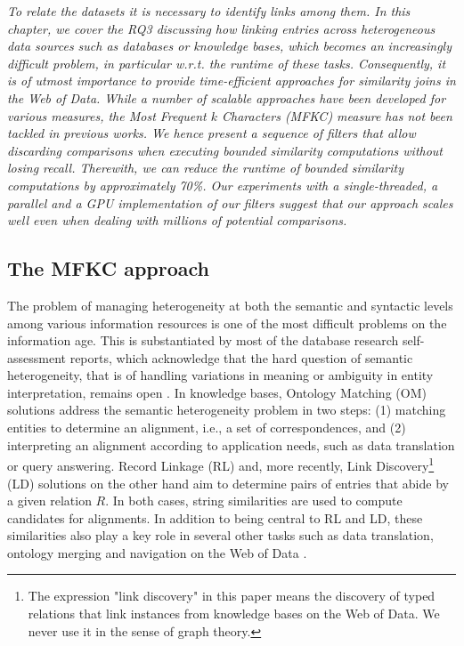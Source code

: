 \textit{To relate the datasets it is necessary to identify links among them. In this chapter, we cover the RQ3 discussing how linking entries across heterogeneous data sources such as databases or knowledge bases, which becomes an increasingly difficult problem, in particular w.r.t. the runtime of these tasks. 
Consequently, it is of utmost importance to provide time-efficient approaches for similarity joins in the Web of Data. 
While a number of scalable approaches have been developed for various measures, the Most Frequent $k$ Characters (MFKC) measure has not been tackled in previous works. 
We hence present a sequence of filters that allow discarding comparisons when executing bounded similarity computations without losing recall. 
Therewith, we can reduce the runtime of bounded similarity computations by approximately 70\%.  
Our experiments with a single-threaded, a parallel and a GPU implementation of our filters suggest that our approach scales well even when dealing with millions of potential comparisons.}

\subsection{The MFKC approach}
The problem of managing heterogeneity at both the semantic and syntactic levels among various information resources \cite{valdestilhasdbpediasameas,shvaiko2013ontology} is one of the most difficult problems on the information age.
This is substantiated by most of the database research self-assessment reports, which acknowledge that the hard question of semantic heterogeneity, that is of handling variations in meaning or ambiguity in entity interpretation, remains open \cite{shvaiko2013ontology}. In knowledge bases, Ontology Matching (OM) solutions address the semantic heterogeneity problem in two steps: (1) matching entities to determine an alignment, i.e., a set of correspondences, and (2) interpreting an alignment according to application needs, such as data translation or query answering. Record Linkage (RL) and, more recently, Link Discovery\footnote{The expression "link discovery" in this paper means the discovery of typed relations that link instances from knowledge bases on the Web of Data. We never use it in the sense of graph theory.} (LD) solutions on the other hand aim to determine pairs of entries that abide by a given relation $R$. In both cases, string similarities are used  to compute candidates for alignments. %
In addition to being central to RL and LD, these similarities also play a key role in several other tasks such as data translation, ontology merging and navigation on the Web of Data \cite{shvaiko2013ontology,euzenat2007ontology}.

